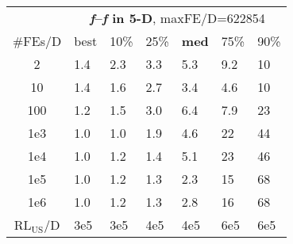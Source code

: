 \begin{tabular}{c|llllll}
 & \multicolumn{6}{|c}{\textbf{\textit{f}\raisebox{-0.35ex}{1}--\textit{f}\raisebox{-0.35ex}{24} in 5-D}, maxFE/D=622854}\\
\#FEs/D & best & 10\% & 25\% & \textbf{med} & 75\% & 90\%\\
2 & \hspace*{1ex}1.4 & \hspace*{1ex}2.3 & \hspace*{1ex}3.3 & \hspace*{1ex}5.3 & \hspace*{1ex}9.2 & 10\\
10 & \hspace*{1ex}1.4 & \hspace*{1ex}1.6 & \hspace*{1ex}2.7 & \hspace*{1ex}3.4 & \hspace*{1ex}4.6 & 10\\
100 & \hspace*{1ex}1.2 & \hspace*{1ex}1.5 & \hspace*{1ex}3.0 & \hspace*{1ex}6.4 & \hspace*{1ex}7.9 & 23\\
1e3 & \hspace*{1ex}1.0 & \hspace*{1ex}1.0 & \hspace*{1ex}1.9 & \hspace*{1ex}4.6 & 22 & 44\\
1e4 & \hspace*{1ex}1.0 & \hspace*{1ex}1.2 & \hspace*{1ex}1.4 & \hspace*{1ex}5.1 & 23 & 46\\
1e5 & \hspace*{1ex}1.0 & \hspace*{1ex}1.2 & \hspace*{1ex}1.3 & \hspace*{1ex}2.3 & 15 & 68\\
1e6 & \hspace*{1ex}1.0 & \hspace*{1ex}1.2 & \hspace*{1ex}1.3 & \hspace*{1ex}2.8 & 16 & 68\\
$\text{RL}_{\text{US}}$/D & 3e5 & 3e5 & 4e5 & 4e5 & 6e5 & 6e5
\end{tabular}
